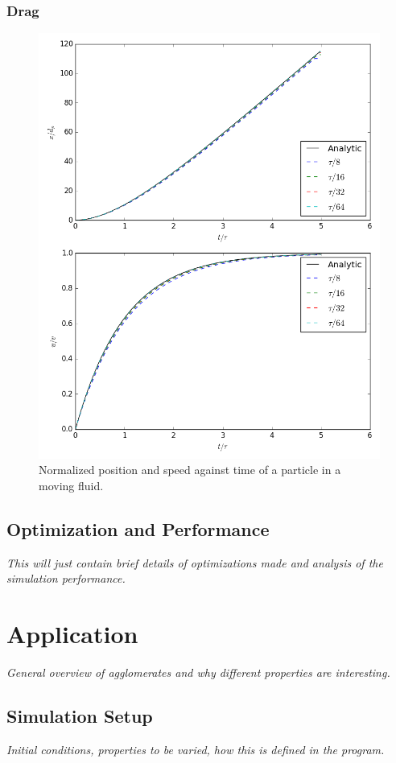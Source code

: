 \documentclass[10pt,a4paper,titlepage]{report}
\begin{document}
\subsection{Drag}
\begin{figure}[!htb]
\centering
\includegraphics[scale=0.5]{figures/drag_verification.png}
\caption{Normalized position and speed against time of a particle in a moving fluid.}
\label{fig:drag_verification}
\end{figure}
\section{Optimization and Performance}
\textit{This will just contain brief details of optimizations made and analysis of the simulation performance.}
\chapter{Application}
\label{ch:Application}
\textit{General overview of agglomerates and why different properties are interesting.}
\section{Simulation Setup}
\textit{Initial conditions, properties to be varied, how this is defined in the program.}
\end{document}
